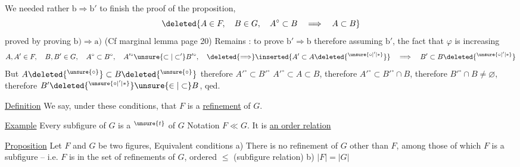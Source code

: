 We needed rather $\mathrm b\Rightarrow\mathrm b'$ to finish the proof of the proposition,    
\[ \deleted{A\in F,\quad B\in G,\quad A^\circ\subset B\quad\Longrightarrow\quad A\subset B} \]
 proved by proving $\mathrm b)\Rightarrow\mathrm a)$ (Cf marginal lemma page 20) Remains : to prove $\mathrm b'\Rightarrow\mathrm b$ therefore assuming $\mathrm{b}'$, the fact that $\varphi$ is increasing
\[ A,A'\in F,\quad B,B'\in G,\quad A^\circ\subset B^\circ,\quad A'^\circ\unsure{\subset|\subset'}B'^\circ,\quad \deleted{\Longrightarrow}\inserted{A'\subset A\deleted{{}^{\unsure{\circ|'|*}}}}\quad\Longrightarrow\quad B'\subset B\deleted{{}^{\unsure{\circ|'|*}}} \]
But      $A\deleted{{}^{\unsure{\circ}}}\subset B\deleted{{}^{\unsure{\circ}}}$   therefore $A'^\circ\subset B'^\circ$ 
$A'^\circ\subset A\subset B$, therefore $A'^\circ\subset B'^\circ\cap B$, therefore $B'^\circ\cap B\ne\varnothing$, therefore $B'\deleted{{}^{\unsure{\circ|'|*}}}\unsure{\in|\subset}B$, qed.

\uline{Definition} We say, under these conditions, that $F$ is a \uline{refinement} of $G$.

\uline{Example} Every subfigure of $G$ is a $^{\unsure{t}}$ of $G$
Notation $F\ll G$. It is \uline{an order relation}

\uline{Proposition} Let $F$ and $G$ be two figures,  Equivalent conditions
a)  There is no refinement of $G$ other than $F$, among those of which $F$ is a subfigure -- i.e. $F$ is  in the set of refinements of $G$, ordered  $\leq$ (subfigure relation)
b)  $|F|=|G|$ 
